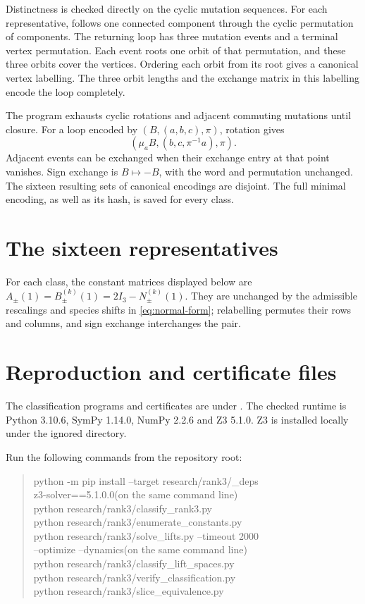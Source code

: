 \documentclass[11pt,a4paper]{article}
\theoremstyle{definition}
\newcommand{\code}[1]{\texttt{\detokenize{#1}}}
\begin{document}
Distinctness is checked directly on the cyclic mutation sequences.
For each representative, \code{slice_equivalence.py} follows one
connected component through the cyclic permutation of components.
The returning loop has three mutation events and a terminal vertex
permutation. Each event roots one orbit of that permutation, and these
three orbits cover the vertices. Ordering each orbit from its root gives
a canonical vertex labelling. The three orbit lengths and the exchange
matrix in this labelling encode the loop completely.

The program exhausts cyclic rotations and adjacent commuting mutations
until closure. For a loop encoded by $(B,(a,b,c),\pi)$, rotation gives
\[
 (\mu_aB,(b,c,\pi^{-1}a),\pi).
\]
Adjacent events can be exchanged when their exchange entry at that
point vanishes. Sign exchange is $B\mapsto-B$, with the word and
permutation unchanged. The sixteen resulting sets of canonical
encodings are disjoint. The full minimal encoding, as well as its hash,
is saved for every class.

\clearpage
\section{The sixteen representatives}\label{sec:catalogue}
For each class, the constant matrices displayed below are
$A_\pm(1)=B_\pm^{(k)}(1)=2I_3-N_\pm^{(k)}(1)$.
They are unchanged by the admissible rescalings and species shifts in
\eqref{eq:normal-form}; relabelling permutes their rows and columns,
and sign exchange interchanges the pair.


\clearpage
\appendix
\section{Reproduction and certificate files}\label{app:reproduce}

The classification programs and certificates are under
\code{research/rank3/}. The checked runtime is Python 3.10.6,
SymPy 1.14.0, NumPy 2.2.6 and Z3 5.1.0. Z3 is installed locally under
the ignored \code{_deps/} directory.

Run the following commands from the repository root:
\begin{quote}\small\ttfamily
python -m pip install --target research/rank3/\_deps\\
\hspace*{1em}z3-solver==5.1.0.0\quad\normalfont(on the same command line)\ttfamily\\[3pt]
python research/rank3/classify\_rank3.py\\
python research/rank3/enumerate\_constants.py\\
python research/rank3/solve\_lifts.py --timeout 2000\\
\hspace*{1em}--optimize --dynamics\quad\normalfont(on the same command line)\ttfamily\\[3pt]
python research/rank3/classify\_lift\_spaces.py\\
python research/rank3/verify\_classification.py\\
python research/rank3/slice\_equivalence.py
\end{quote}
\end{document}
